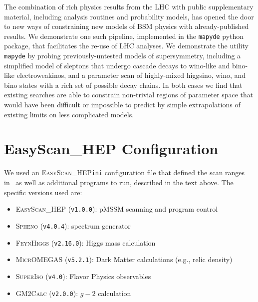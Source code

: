 \documentclass{article}
\newcommand{\mapyde}{\texttt{mapyde}}
\newcommand{\easyscanhep}{\textsc{EasyScan\_HEP}}
\newcommand{\spheno}{\textsc{Spheno}}
\newcommand{\feynhiggs}{\textsc{FeynHiggs}}
\newcommand{\micromegas}{\textsc{MicrOMEGAS}}
\newcommand{\superiso}{\textsc{SuperIso}}
\newcommand{\gmtwocalc}{\textsc{GM2Calc}}
\begin{document}
The combination of rich physics results from the LHC with public supplementary material, including analysis routines and probability models, has opened the door to new ways of constraining new models of BSM physics with already-published results.  We demonstrate one such pipeline, implemented in the \mapyde{} python package, that facilitates the re-use of LHC analyses.  We demonstrate the utility \mapyde{} by probing previously-untested models of supersymmetry, including a simplified model of sleptons that undergo cascade decays to wino-like and bino-like electroweakinos, and a parameter scan of highly-mixed higgsino, wino, and bino states with a rich set of possible decay chains.  In both cases we find that existing searches are able to constrain non-trivial regions of parameter space that would have been difficult or impossible to predict by simple extrapolations of existing limits on less complicated models.

\printbibliography

\appendix

\section{EasyScan\_HEP Configuration}
\label{sec:easyscan-hep-configuration}

We used an \easyscanhep \texttt{ini} configuration file that defined the scan ranges in~ as well as additional programs to run, described in the text above. The specific versions used are:

\begin{itemize}
	\item \easyscanhep{} (\texttt{v1.0.0}): pMSSM scanning and program control~\cite{easyscanhep,Han:2016gvr}
	\item \spheno{} (\texttt{v4.0.4}): spectrum generator~\cite{Porod:2003um,Porod:2011nf}
	\item \feynhiggs{} (\texttt{v2.16.0}): Higgs mass calculation~\cite{Bahl:2018qog,Bahl:2017aev,Bahl:2016brp,Hahn:2013ria,Frank:2006yh,Degrassi:2002fi,Heinemeyer:1998np,Heinemeyer:1998yj}
	\item \micromegas{} (\texttt{v5.2.1}): Dark Matter calculations (e.g., relic density)~\cite{Belanger:2020gnr}
	\item \superiso{} (\texttt{v4.0}): Flavor Physics observables~\cite{Arbey:2018msw}
	\item \gmtwocalc{} (\texttt{v2.0.0}): $g-2$ calculation~\cite{Athron:2015rva,Athron:2021evk}
\end{itemize}
\end{document}
